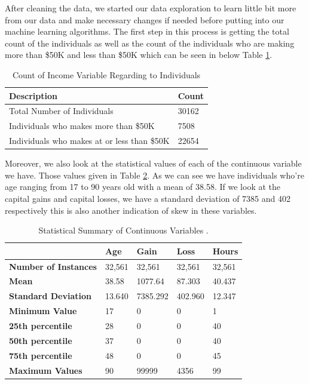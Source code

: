 \documentclass[sigconf]{acmart}
\begin{document}
After cleaning the data, we started our data exploration to learn little bit more from our data and make necessary changes if needed before putting into our machine learning algorithms. The first step in this process is getting the total count of the individuals as well as the count of the individuals who are making more than \$50K and less than \$50K which can be seen in below Table \ref{my-label-2}.

\begin{table}[!ht]
\centering
\begin{tabular}{|l|l|}
\hline
\textbf{Description}                        & \textbf{Count} \\ \hline
Total Number of Individuals                 & 30162          \\ \hline
Individuals who makes more than \$50K       & 7508           \\ \hline
Individuals who makes at or less than \$50K & 22654          \\ \hline
\end{tabular}
\caption{Count of Income Variable Regarding to Individuals}
\label{my-label-2}
\end{table}


\par Moreover, we also look at the statistical values of each of the continuous variable we have. Those values given in Table \ref{my-label}. As we can see we have individuals who're age ranging from 17 to 90 years old with a mean of 38.58. If we look at the capital gains and capital losses, we have a standard deviation of 7385 and 402 respectively this is also another indication of skew in these variables. 

\begin{table}[!ht]
\centering
\begin{tabular}{|l|l|l|l|l|}
\hline
                    & \textbf{Age} & \textbf{Gain} & \textbf{Loss} & \textbf{Hours} \\ \hline
\textbf{Number of Instances} & 32,561 & 32,561       & 32,561       & 32,561         \\ \hline
\textbf{Mean}                & 38.58  & 1077.64      & 87.303       & 40.437         \\ \hline
\textbf{Standard Deviation}  & 13.640 & 7385.292     & 402.960      & 12.347         \\ \hline
\textbf{Minimum Value}       & 17     & 0            & 0            & 1              \\ \hline
\textbf{25th percentile}     & 28     & 0            & 0            & 40             \\ \hline
\textbf{50th percentile}     & 37     & 0            & 0            & 40             \\ \hline
\textbf{75th percentile}     & 48     & 0            & 0            & 45             \\ \hline
\textbf{Maximum Values}      & 90     & 99999        & 4356         & 99             \\ \hline
\end{tabular}
\caption{Statistical Summary of Continuous Variables \cite{Borga2017}.}
\label{my-label}
\end{table}
\end{document}
